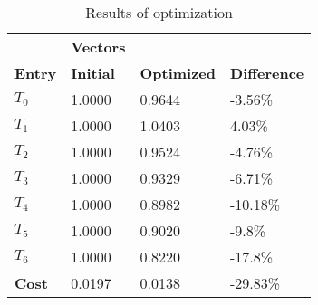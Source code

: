 \begin{table}[h!]
\centering
\begin{tabular}{llll}
\textbf{}      & \cellcolor[HTML]{EFEFEF}\textbf{Vectors} & \textbf{} & \textbf{}         \\
\rowcolor[HTML]{EFEFEF} 
\textbf{Entry} & \textbf{Initial} & \textbf{Optimized} & \textbf{Difference} \\
$T_0$ & 1.0000 & 0.9644 & -3.56\% \\ 
$T_1$ & 1.0000 & 1.0403 & 4.03\% \\ 
$T_2$ & 1.0000 & 0.9524 & -4.76\% \\ 
$T_3$ & 1.0000 & 0.9329 & -6.71\% \\ 
$T_4$ & 1.0000 & 0.8982 & -10.18\% \\ 
$T_5$ & 1.0000 & 0.9020 & -9.8\% \\ 
$T_6$ & 1.0000 & 0.8220 & -17.8\% \\ 
\rowcolor[HTML]{EFEFEF} 
\textbf{Cost}  & 0.0197 & 0.0138 & -29.83\% \\ 
\end{tabular}
\caption{Results of optimization}
\label{tab:OptimizationAnalysis}
\end{table}